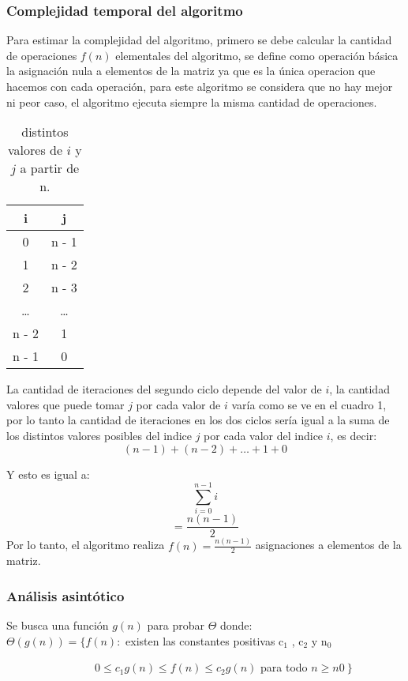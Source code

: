 \documentclass[11pt]{article}
\begin{document}
\subsubsection{Complejidad temporal del algoritmo}
Para estimar la complejidad del algoritmo, primero se debe calcular la cantidad de operaciones \(f(n)\) elementales del algoritmo, se define como operación básica la asignación nula a elementos de la matriz ya que es la única operacion que hacemos con cada operación, para este algoritmo se considera que no hay mejor ni peor caso, el algoritmo ejecuta siempre la misma cantidad de operaciones. 

\begin{table}[h!]
\centering
\begin{tabular}{||c c||}
\hline 
\textbf{i}  &\textbf{j}  \\[0.5ex] \hline\hline
0  & n - 1 \\ \hline 
1  & n - 2 \\ \hline 
2 & n - 3  \\ \hline 
\dots  & \dots \\ \hline 
n - 2  &1 \\ \hline 
n - 1  &0  \\ \hline 
\end{tabular} 
\caption{distintos valores de \(i\) y \(j\)  a partir de n.}

\end{table}

La cantidad de iteraciones del segundo ciclo depende del valor de \(i\), la cantidad valores que puede tomar \(j\) por cada valor de \(i\) varía como se ve en el cuadro 1, por lo tanto la cantidad de iteraciones en los dos ciclos sería igual a la suma de los distintos valores posibles del indice \(j\) por cada valor del indice \(i\), es decir: \[(n-1)+(n-2)+ \dots +1+0\]

Y esto es igual a:
\[\sum_{i=0}^{n-1}  i\]
\[= \frac{n(n-1)}{2} \]
Por lo tanto, el algoritmo realiza \(f(n) = \frac{n(n-1)}{2}\) asignaciones a elementos de la matriz.
 \clearpage
\subsubsection{Análisis asintótico}
Se busca una función \(g(n)\) para probar $\Theta$ donde:\\

\( \Theta (g(n))  =  \{ f (n) :\) existen las constantes positivas c$_1$ , c$_2$ y n$_0$ 

\ \ \ \ \ \ \ \ \ \ \ \ \ \ \ \ \(0\leq  c_1 g (n) \leq f (n) \leq c_2 g (n)\) para todo \( n \geq n0 \ \}  \)\\
\end{document}
